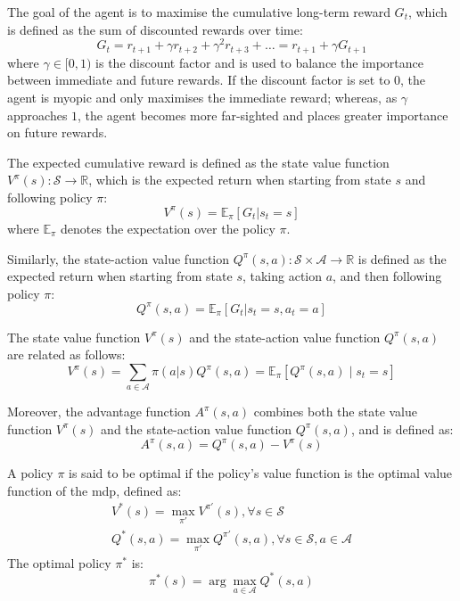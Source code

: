 The goal of the agent is to maximise the cumulative long-term reward $G_t$, which is defined as the sum of discounted rewards over time:
\begin{equation}
    G_t = r_{t+1} + \gamma r_{t+2} + \gamma^2 r_{t+3} + \dots = r_{t+1} + \gamma G_{t+1}
\end{equation}
where $\gamma \in [0, 1)$ is the discount factor and is used to balance the importance between immediate and future rewards. If the discount factor is set to 0, the agent is myopic and only maximises the immediate reward; whereas, as $\gamma$ approaches $1$, the agent becomes more far-sighted and places greater importance on future rewards.

The expected cumulative reward is defined as the state value function $V^\pi(s): \mathcal{S} \to \mathbb{R}$, which is the expected return when starting from state $s$ and following policy $\pi$:
\begin{equation}
    V^\pi(s) = \mathbb{E}_\pi \left[G_t | s_t = s\right] 
\end{equation}
where $\mathbb{E}_\pi$ denotes the expectation over the policy $\pi$.

Similarly, the state-action value function $Q^\pi(s, a): \mathcal{S} \times \mathcal{A} \to \mathbb{R}$ is defined as the expected return when starting from state $s$, taking action $a$, and then following policy $\pi$:
\begin{equation}
    Q^\pi(s, a) = \mathbb{E}_\pi \left[G_t | s_t = s, a_t = a\right] 
\end{equation}

The state value function $V^\pi(s)$ and the state-action value function $Q^\pi(s, a)$ are related as follows:
\begin{equation}
    V^\pi(s) = \sum_{a \in \mathcal{A}} \pi(a | s) Q^\pi(s, a) = \mathbb{E}_\pi \left[Q^\pi(s, a) \mid s_t = s\right]
\end{equation}

Moreover, the advantage function $A^\pi(s, a)$ combines both the state value function $V^\pi(s)$ and the state-action value function $Q^\pi(s, a)$, and is defined as:
\begin{equation}
    A^\pi(s, a) = Q^\pi(s, a) - V^\pi(s)
\end{equation} 

A policy $\pi$ is said to be optimal if the policy's value function is the optimal value function of the \acrshort{mdp}, defined as: 
\begin{eqnarray}
    V^*(s) = \max_{\pi'} V^{\pi'}(s), \forall s \in \mathcal{S} \\ 
    Q^*(s, a) = \max_{\pi'} Q^{\pi'}(s, a), \forall s \in \mathcal{S}, a \in \mathcal{A}
\end{eqnarray}
The optimal policy $\pi^*$ is:
\begin{equation}
    \pi^*(s) = \arg \max_{a\in \mathcal{A}} Q^*(s, a)
\end{equation}

